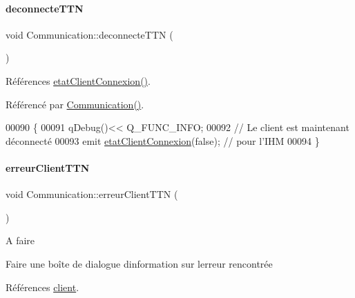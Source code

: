 \paragraph{\texorpdfstring{deconnecte\+T\+TN}{deconnecteTTN}}
{\footnotesize\ttfamily void Communication\+::deconnecte\+T\+TN (\begin{DoxyParamCaption}{ }\end{DoxyParamCaption})\hspace{0.3cm}{\ttfamily [slot]}}



Références \hyperlink{class_communication_aa6100d6b2addece57f3e74c1140a3179}{etat\+Client\+Connexion()}.



Référencé par \hyperlink{class_communication_a7376830f5598b7e3c0eb4434a8a8766e}{Communication()}.


\begin{DoxyCode}
00090 \{
00091     qDebug()<< Q\_FUNC\_INFO;
00092     \textcolor{comment}{// Le client est maintenant déconnecté}
00093     emit \hyperlink{class_communication_aa6100d6b2addece57f3e74c1140a3179}{etatClientConnexion}(\textcolor{keyword}{false}); \textcolor{comment}{// pour l'IHM}
00094 \}
\end{DoxyCode}
\mbox{\label{class_communication_ae1a84ffd9317d0e4e27a6633cef43b64}} 
\paragraph{\texorpdfstring{erreur\+Client\+T\+TN}{erreurClientTTN}}
{\footnotesize\ttfamily void Communication\+::erreur\+Client\+T\+TN (\begin{DoxyParamCaption}{ }\end{DoxyParamCaption})\hspace{0.3cm}{\ttfamily [slot]}}

\begin{DoxyRefDesc}{A faire}
\item[\hyperlink{todo__todo000005}{A faire}]Faire une boîte de dialogue d\textquotesingle{}information sur l\textquotesingle{}erreur rencontrée \end{DoxyRefDesc}


Références \hyperlink{class_communication_a59ae01a54d6c3fde6242c46d802b954b}{client}.



